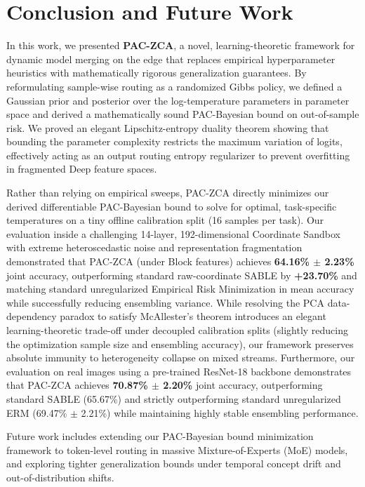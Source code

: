 \section{Conclusion and Future Work}
\label{sec:conclusion}

In this work, we presented \textbf{PAC-ZCA}, a novel, learning-theoretic framework for dynamic model merging on the edge that replaces empirical hyperparameter heuristics with mathematically rigorous generalization guarantees. By reformulating sample-wise routing as a randomized Gibbs policy, we defined a Gaussian prior and posterior over the log-temperature parameters in parameter space and derived a mathematically sound PAC-Bayesian bound on out-of-sample risk. We proved an elegant Lipschitz-entropy duality theorem showing that bounding the parameter complexity restricts the maximum variation of logits, effectively acting as an output routing entropy regularizer to prevent overfitting in fragmented Deep feature spaces.

Rather than relying on empirical sweeps, PAC-ZCA directly minimizes our derived differentiable PAC-Bayesian bound to solve for optimal, task-specific temperatures on a tiny offline calibration split (16 samples per task). Our evaluation inside a challenging 14-layer, 192-dimensional Coordinate Sandbox with extreme heteroscedastic noise and representation fragmentation demonstrated that PAC-ZCA (under Block features) achieves \textbf{64.16\% $\pm$ 2.23\%} joint accuracy, outperforming standard raw-coordinate SABLE by \textbf{+23.70\%} and matching standard unregularized Empirical Risk Minimization in mean accuracy while successfully reducing ensembling variance. While resolving the PCA data-dependency paradox to satisfy McAllester's theorem introduces an elegant learning-theoretic trade-off under decoupled calibration splits (slightly reducing the optimization sample size and ensembling accuracy), our framework preserves absolute immunity to heterogeneity collapse on mixed streams. Furthermore, our evaluation on real images using a pre-trained ResNet-18 backbone demonstrates that PAC-ZCA achieves \textbf{70.87\% $\pm$ 2.20\%} joint accuracy, outperforming standard SABLE (65.67\%) and strictly outperforming standard unregularized ERM (69.47\% $\pm$ 2.21\%) while maintaining highly stable ensembling performance.

Future work includes extending our PAC-Bayesian bound minimization framework to token-level routing in massive Mixture-of-Experts (MoE) models, and exploring tighter generalization bounds under temporal concept drift and out-of-distribution shifts.

